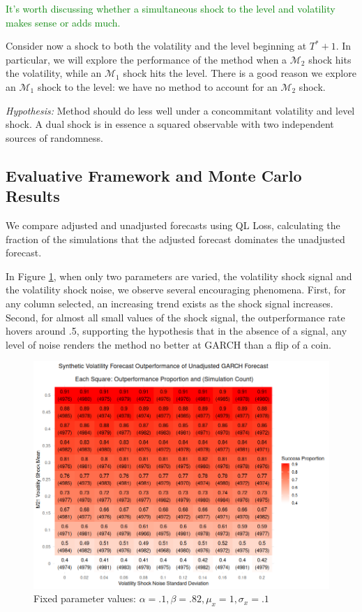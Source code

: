 \documentclass[11pt]{article}
\def\mc#1{\mathcal{#1}} %
\def\mc#1{\mathcal{#1}}
\theoremstyle{definition}
\begin{document}
\textcolor{green}{It's worth discussing whether a simultaneous shock to the level and volatility makes sense or adds much.}

Consider now a shock to both the volatility and the level beginning at $T^{*}+1$.  In particular, we will explore the performance of the method when a  $\mc{M}_{2}$ shock hits the volatility, while an $\mc{M}_{1}$ shock hits the level.  There is a good reason we explore an $\mc{M}_{1}$ shock to the level: we have no method to account for an $\mc{M}_{2}$ shock.

\textit{Hypothesis:} Method should do less well under a concommitant volatility and level shock.  A dual shock is in essence a squared observable with two independent sources of randomness.

\subsection{Evaluative Framework and Monte Carlo Results}
We compare adjusted and unadjusted forecasts using QL Loss, calculating the fraction of the simulations that the adjusted forecast dominates the unadjusted forecast.

In Figure \ref{fig:heavy_beta}, when only two parameters are varied, the volatility shock signal and the volatility shock noise, we observe several encouraging phenomena.  First, for any column selected, an increasing trend exists as the shock signal increases.  Second, for almost all small values of the shock signal, the outperformance rate hovers around .5, supporting the hypothesis that in the absence of a signal, any level of noise renders the method no better at GARCH than a flip of a coin.
\begin{figure}[h!]
  \begin{center}
    \includegraphics[scale=.45]{simulation_plots/standard_simulation_alpha_.1_beta_.82.png}
    \caption{Fixed parameter values: $\alpha = .1, \beta = .82, \mu_{x} = 1, \sigma_{x} = .1$}\label{fig:heavy_beta}
  \end{center}
  \end{figure}
  
\end{document}
